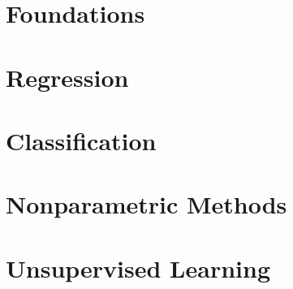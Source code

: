 \documentclass[12pt, a4paper, oneside, fleqn]{notes}
\begin{document}
\tableofcontents

\chapter{Foundations}

\chapter{Regression}

\chapter{Classification}

\chapter{Nonparametric Methods}

\chapter{Unsupervised Learning}
\end{document}
